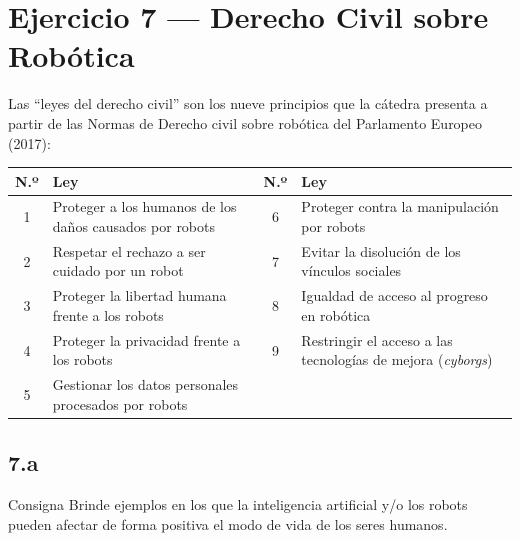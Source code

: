 \documentclass[11pt,a4paper]{article}
\begin{document}
\section{Ejercicio 7 --- Derecho Civil sobre Robótica}

Las ``leyes del derecho civil'' son los nueve principios que la cátedra presenta a partir de las Normas de Derecho civil sobre robótica del Parlamento Europeo (2017):

\begin{center}
\small
\begin{tabularx}{\linewidth}{@{}c X c X@{}}
\toprule
\textbf{N.º} & \textbf{Ley} & \textbf{N.º} & \textbf{Ley} \\
\midrule
1 & Proteger a los humanos de los daños causados por robots & 6 & Proteger contra la manipulación por robots \\
2 & Respetar el rechazo a ser cuidado por un robot & 7 & Evitar la disolución de los vínculos sociales \\
3 & Proteger la libertad humana frente a los robots & 8 & Igualdad de acceso al progreso en robótica \\
4 & Proteger la privacidad frente a los robots & 9 & Restringir el acceso a las tecnologías de mejora (\textit{cyborgs}) \\
5 & Gestionar los datos personales procesados por robots & & \\
\bottomrule
\end{tabularx}
\end{center}

\subsection{7.a}

\begin{enunciado}{Consigna}
Brinde ejemplos en los que la inteligencia artificial y/o los robots pueden afectar de forma positiva el modo de vida de los seres humanos.
\end{enunciado}
\end{document}
